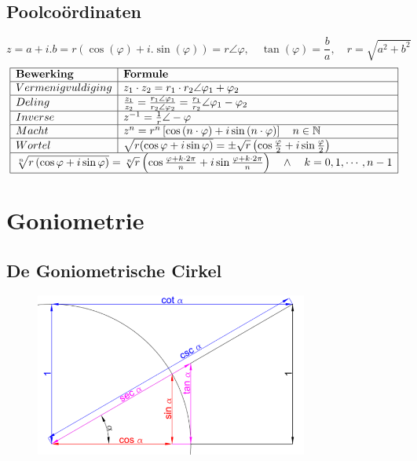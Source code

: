 \documentclass[a5paper]{article}
\begin{document}
\subsection{Poolcoördinaten}
\[z = a + i.b = r\left( {\cos (\varphi ) + i.\sin (\varphi )} \right) = r\angle \varphi ,\quad \tan (\varphi ) = \frac{b}{a},\quad r = \sqrt {{a^2} + {b^2}} \]
\[
\begin{array}{|l|l|}
\hline
\textbf{Bewerking} & \textbf{Formule} \\
\hline
Vermenigvuldiging & {z_1} \cdot {z_2} = {r_1} \cdot {r_2}\angle {\varphi _1} + {\varphi _2} \\
\hline
Deling & \frac{{{z_1}}}{{{z_2}}} = \frac{{{r_1}\angle {\varphi _1}}}{{{r_2}\angle {\varphi _2}}} = \frac{{{r_1}}}{{{r_2}}}\angle {\varphi _1} - {\varphi _2} \\
\hline
Inverse & {z^{ - 1}} = \frac{1}{r}\angle  - \varphi  \\ \hline
Macht & {z^n} = {r^n}\left[ {\cos \left( {n \cdot \varphi } \right) + i\sin \left( {n \cdot \varphi } \right)} \right]\quad n \in {\displaystyle \mathbb {N} }\\
\hline
Wortel & 
\sqrt {r(\cos \varphi  + i\sin \varphi )}  =  \pm \sqrt r \left( {\cos \frac{\varphi }{2} + i\sin \frac{\varphi }{2}} \right)\\
\hline
\multicolumn{2}{|c|}{\sqrt[n]{{r\left( {\cos \varphi  + i\sin \varphi } \right)}} = \sqrt[n]{r}\left( {\cos \frac{{\varphi  + k \cdot 2\pi }}{n} + i\sin \frac{{\varphi  + k \cdot 2\pi }}{n}} \right)\quad  \wedge \quad k = 0,1, \cdots ,n - 1} \\
\hline
 \end{array}
\]

\newpage

\section{Goniometrie}
\subsection{De Goniometrische Cirkel}

\begin{figure}[h]
\centering
\includegraphics[width=0.8\textwidth]{image_goniometrie.png}
\label{fig:goniometrie}
\end{figure}
\end{document}
